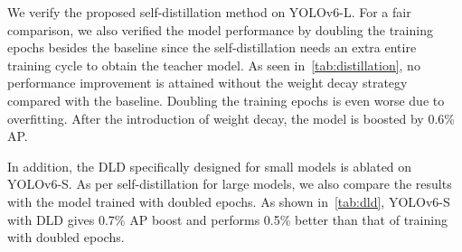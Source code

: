 \documentclass[10pt,twocolumn,letterpaper]{article}
\begin{document}
\begin{table}[ht]
  \centering
  \caption{Ablation on the self-distillation on YOLOv6-L.}
  \label{tab:distillation}
\end{table}

\begin{table}
  \centering
  \caption{Ablation study of DLD on YOLOv6-S.}
  \label{tab:dld}
\end{table}

We verify the proposed self-distillation method on YOLOv6-L. For a fair comparison, we also verified the model performance by doubling the training epochs besides the baseline since the self-distillation needs an extra entire training cycle to obtain the teacher model. As seen in~\cref{tab:distillation}, no performance improvement is attained without the weight decay strategy compared with the baseline. Doubling the training epochs is even worse due to overfitting. After the introduction of weight decay, the model is boosted by 0.6\% AP.

In addition, the DLD specifically designed for small models is ablated on YOLOv6-S. As per self-distillation for large models, we also compare the results with the model trained with doubled epochs. As shown in~\cref{tab:dld}, YOLOv6-S with DLD gives 0.7\% AP boost and performs 0.5\% better than that of training with doubled epochs.
\end{document}

